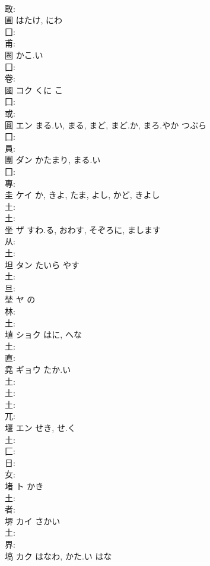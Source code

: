\documentclass[8pt]{extreport}
\begin{document}
\begin{CJK}{UTF8}{min}
\\	敢: 
\\	圃		はたけ, にわ			
\\	囗: 
\\	甫: 
\\	圈		かこ.い				
\\	囗: 
\\	卷: 
\\	國	コク	くに	こ	
\\	囗: 
\\	或: 
\\	圓	エン	まる.い, まる, まど, まど.か, まろ.やか	つぶら	
\\	囗: 
\\	員: 
\\	團	ダン	かたまり, まる.い		
\\	囗: 
\\	專: 
\\	圭	ケイ		か, きよ, たま, よし, かど, きよし	
\\	土: 
\\	土: 
\\	坐	ザ	すわ.る, おわす, そぞろに, まします		
\\	从: 
\\	土: 
\\	坦	タン	たいら	やす	
\\	土: 
\\	旦: 
\\	埜	ヤ	の			
\\	林: 
\\	土: 
\\	埴	ショク	はに, へな		
\\	土: 
\\	直: 
\\	堯	ギョウ	たか.い		
\\	土: 
\\	土: 
\\	土: 
\\	兀: 
\\	堰	エン	せき, せ.く		
\\	土: 
\\	匚: 
\\	日: 
\\	女: 
\\	堵	ト	かき		
\\	土: 
\\	者: 
\\	堺	カイ	さかい		
\\	土: 
\\	界: 
\\	塙	カク	はなわ, かた.い	はな	

\end{CJK}
\end{document}
